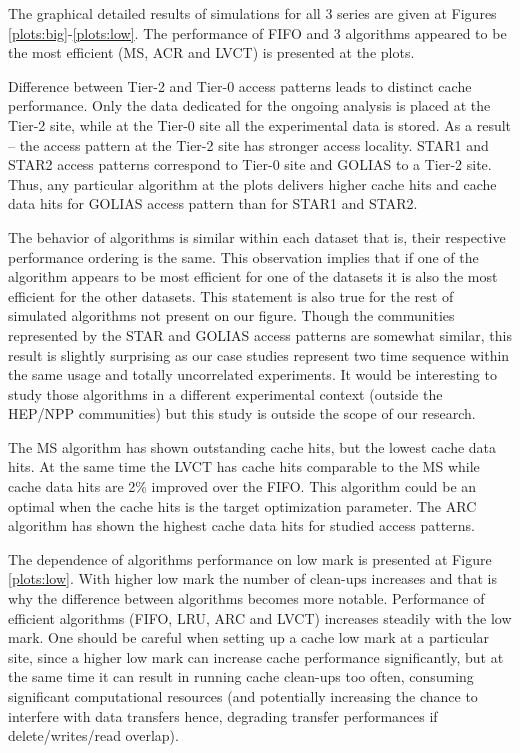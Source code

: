 \documentclass[english]{ddny}
\begin{document}
The graphical detailed results of simulations for all 3 series are given at Figures \ref{plots:big}-\ref{plots:low}. The performance of FIFO and 3 algorithms appeared to be the most efficient (MS, ACR and LVCT) is presented at the plots. 

Difference between Tier-2 and Tier-0 access patterns leads to distinct cache performance. Only the data dedicated for the ongoing analysis is placed at the Tier-2 site, while at the Tier-0 site all the experimental data is stored. As a result -- the access pattern at the Tier-2 site has stronger access locality. STAR1 and STAR2 access patterns correspond to Tier-0 site and GOLIAS to a Tier-2 site.  Thus, any particular algorithm at the plots delivers higher cache hits and cache data hits for GOLIAS access pattern than for STAR1 and STAR2.  


The behavior of algorithms is similar within each dataset that is, their respective performance ordering is the same. This observation implies that if one of the algorithm appears to be most efficient for one of the datasets it is also the most efficient for the other datasets. This statement is also true for the rest of simulated algorithms not present on our figure. Though the communities represented by the STAR and GOLIAS access patterns are somewhat similar, this result is slightly surprising as our case studies represent two time sequence within the same usage and totally uncorrelated experiments. It would be interesting to study those algorithms in a different experimental context (outside the HEP/NPP communities) but this study is outside the scope of our research. 

The MS algorithm has shown outstanding cache hits, but the lowest cache data hits. At the same time the LVCT has cache hits comparable to the MS while cache data hits are 2\% improved over the FIFO. This algorithm could be an optimal when the cache hits is the target optimization parameter. The ARC algorithm has shown the highest cache data hits for studied access patterns.

The dependence of algorithms performance on low mark is presented at Figure \ref{plots:low}. With higher low mark the number of clean-ups increases and that is why the difference between algorithms becomes more notable. Performance of efficient algorithms (FIFO, LRU, ARC and LVCT) increases steadily with the low mark. One should be careful when setting up a cache low mark at a particular site, since a higher low mark can increase cache performance significantly, but at the same time it can result in running cache clean-ups too often, consuming significant computational resources (and potentially increasing the chance to interfere with data transfers hence, degrading transfer performances if delete/writes/read overlap).
\end{document}
